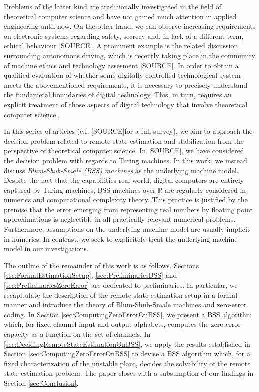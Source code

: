 \documentclass[conference]{IEEEtran}
\def\RR{{\mathbb R}}
\newcommand{\sdummy}{{\color{red}[SOURCE]}}
\begin{document}
	Problems of the latter kind are traditionally investigated in the field of theoretical computer science and have not gained much attention in applied engineering until now. 
	On the other hand, we can observe increasing requirements on electronic systems regarding safety, secrecy and, in lack of a different term, ethical behaviour \sdummy. 
	A prominent example is the related discussion surrounding autonomous driving, which is recently taking place in the community of machine ethics and technology assesment \sdummy. 
	In order to obtain a qualified evaluation of whether some digitally controlled technological system meets the abovementioned requirements, it is necessary to precisely understand 
	the fundametal boundaries of digital technology. This, in turn, requires an explicit treatment of those aspects of digital technology that involve theoretical computer science.

	In this series of articles (c.f. \sdummy for a full survey), we aim to approach the decision problem related to remote state estimation and stabilization from the perspective 
	of theoretical computer science. In \sdummy, we have considered the decision problem with regards to Turing machines. In this work, we instead discuss 
	\emph{Blum-Shub-Smale (BSS) machines} as the underlying machine model. Despite the fact that the capabilities real-world, digital computers are 
	entirely captured by Turing machines, BSS machines over \(\RR\) are regularly considered in numerics and computational complexity theory. 
	This practice is justified by the premise that the error emerging from representing real numbers by floating point approximations is neglectible in all practically relevant numerical problems. 
	Furthermore, assumptions on the underlying machine model are usually implicit in numerics. In contrast, we seek to explicitely treat the underlying machine model in our investigations.

	The outline of the remainder of this work is as follows. Sections \ref{sec:FormalEstimationSetup}, \ref{sec:PreliminariesBSS} and \ref{sec:PreliminariesZeroError} are dedicated to preliminaries. 
	In particular, we recapitulate the description of the remote state estimation setup in a formal manner and introduce the theory of Blum-Shub-Smale machines and zero-error coding.
	In Section \ref{sec:ComputingZeroErrorOnBSS}, we present a BSS algorithm which, for fixed channel input and output alphabets, computes the zero-error capacity as a function on 
	the set of channels. In \ref{sec:DecidingRemoteStateEstimationOnBSS}, we apply the results established in Section \ref{sec:ComputingZeroErrorOnBSS} to devise a BSS algorithm
	which, for a fixed characterization of the unstable plant, decides the solvability of the remote state estimation problem. The paper closes with a subsumption of 
	our findings in Section \ref{sec:Conclusion}.
                                                                        
\end{document}
